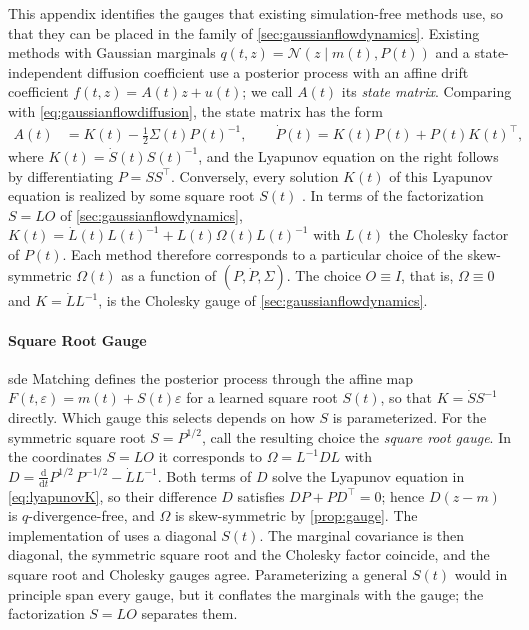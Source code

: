 \documentclass{article} %
\newcommand{\postdrift}{f}
\newcommand{\gauge}{\Omega}
\newcommand{\diff}{{\mathrm{d}}}
\newcommand{\Norm}{\mathcal{N}}
\begin{document}
This appendix identifies the gauges that existing simulation-free methods use, so that they can be placed in the family of \cref{sec:gaussianflowdynamics}. Existing methods with Gaussian marginals $q(t, z) = \Norm(z \mid m(t), P(t))$ and a state-independent diffusion coefficient use a posterior process with an affine drift coefficient $\postdrift(t, z) = A(t) z + u(t)$; we call $A(t)$ its \emph{state matrix}. Comparing with \cref{eq:gaussianflowdiffusion}, the state matrix has the form
\begin{align}
    A(t) &= K(t) - \frac{1}{2} \Sigma(t) P(t)^{-1}, \qquad \dot P(t) = K(t) P(t) + P(t) K(t)^\top, \label{eq:lyapunovK}
\end{align}
where $K(t) = \dot S(t) S(t)^{-1}$, and the Lyapunov equation on the right follows by differentiating $P = S S^\top$. Conversely, every solution $K(t)$ of this Lyapunov equation is realized by some square root $S(t)$ \citep{smith2026closing}. In terms of the factorization $S = L O$ of \cref{sec:gaussianflowdynamics}, $K(t) = \dot L(t) L(t)^{-1} + L(t) \gauge(t) L(t)^{-1}$ with $L(t)$ the Cholesky factor of $P(t)$. Each method therefore corresponds to a particular choice of the skew-symmetric $\gauge(t)$ as a function of $(P, \dot P, \Sigma)$. The choice $O \equiv I$, that is, $\gauge \equiv 0$ and $K = \dot L L^{-1}$, is the Cholesky gauge of \cref{sec:gaussianflowdynamics}.

\paragraph{Square Root Gauge}
\gls{sde} Matching \citep{bartosh2025sde} defines the posterior process through the affine map $F(t, \varepsilon) = m(t) + S(t) \varepsilon$ for a learned square root $S(t)$, so that $K = \dot S S^{-1}$ directly. Which gauge this selects depends on how $S$ is parameterized. For the symmetric square root $S = P^{1/2}$, \citet{smith2026closing} call the resulting choice the \emph{square root gauge}. In the coordinates $S = L O$ it corresponds to $\gauge = L^{-1} D L$ with $D = \frac{\diff}{\diff t} P^{1/2} \, P^{-1/2} - \dot L L^{-1}$. Both terms of $D$ solve the Lyapunov equation in \cref{eq:lyapunovK}, so their difference $D$ satisfies $D P + P D^\top = 0$; hence $D (z - m)$ is $q$-divergence-free, and $\gauge$ is skew-symmetric by \cref{prop:gauge}. The implementation of \citet{bartosh2025sde} uses a diagonal $S(t)$. The marginal covariance is then diagonal, the symmetric square root and the Cholesky factor coincide, and the square root and Cholesky gauges agree. Parameterizing a general $S(t)$ would in principle span every gauge, but it conflates the marginals with the gauge; the factorization $S = L O$ separates them.
\end{document}
